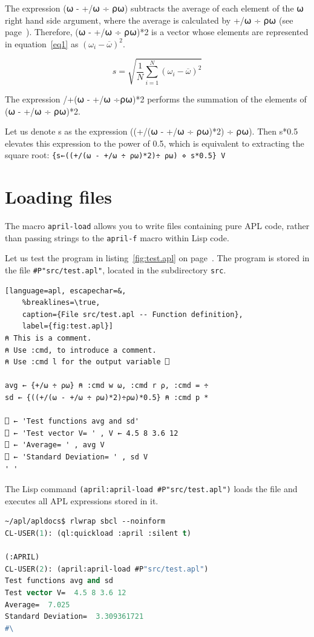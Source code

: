 \documentclass[a4paper,12pt]{book}
\begin{document}
The expression (⍵ - +/⍵ ÷ ⍴⍵) subtracts the
average of each element of the ⍵ right
hand side argument, where the average
is calculated by +/⍵ ÷ ⍴⍵ (see
page~\pageref{april:install}).
Therefore, (⍵ - +/⍵ ÷ ⍴⍵)*2 is a vector
whose elements are represented in
equation~\ref{eq1} as
$(\omega_i - \overline{\omega})^2$.

\begin{equation} \label{eq1}
  s = \sqrt{\frac{1}{N} \sum_{i=1}^N
         (\omega_i - \overline{\omega})^2}
\end{equation}

The expression /+(⍵ - +/⍵ ÷⍴⍵)*2 performs the summation
of the elements of (⍵ - +/⍵ ÷ ⍴⍵)*2.

Let us denote s as the expression
((+/(⍵ - +/⍵ ÷ ⍴⍵)*2) ÷ ⍴⍵).
Then s*0.5 elevates this
expression to the power of 0.5, which is
equivalent to extracting the square root:
\verb|{s←((+/(⍵ - +/⍵ ÷ ⍴⍵)*2)÷ ⍴⍵) ⋄ s*0.5} V|

\section{Loading files}
The macro \verb|april-load| allows you to write
files containing pure APL code, rather than passing
strings to the \verb|april-f| macro within Lisp code.

Let us test the program in listing~\ref{fig:test.apl}
on page~\pageref{fig:test.apl}. The program is stored
in the file \verb|#P"src/test.apl"|, located in
the subdirectory \verb|src|.

\begin{lstlisting}[language=apl, escapechar=&,
    %breaklines=\true,
    caption={File src/test.apl -- Function definition},
    label={fig:test.apl}]
⍝ This is a comment.
⍝ Use :cmd, to introduce a comment.
⍝ Use :cmd l for the output variable ⎕

avg ← {+/⍵ ÷ ⍴⍵} ⍝ :cmd w ⍵, :cmd r ⍴, :cmd = ÷
sd ← {((+/(⍵ - +/⍵ ÷ ⍴⍵)*2)÷⍴⍵)*0.5} ⍝ :cmd p *

⎕ ← 'Test functions avg and sd'
⎕ ← 'Test vector V= ' , V ← 4.5 8 3.6 12
⎕ ← 'Average= ' , avg V
⎕ ← 'Standard Deviation= ' , sd V
' '
\end{lstlisting}


The Lisp command \verb|(april:april-load #P"src/test.apl")|
loads the file and executes all APL expressions stored in it.
\begin{lstlisting}[language=lisp]
~/apl/apldocs$ rlwrap sbcl --noinform
CL-USER(1): (ql:quickload :april :silent t)

(:APRIL)
CL-USER(2): (april:april-load #P"src/test.apl")
Test functions avg and sd
Test vector V=  4.5 8 3.6 12
Average=  7.025
Standard Deviation=  3.309361721
#\ 
\end{lstlisting}
\end{document}
